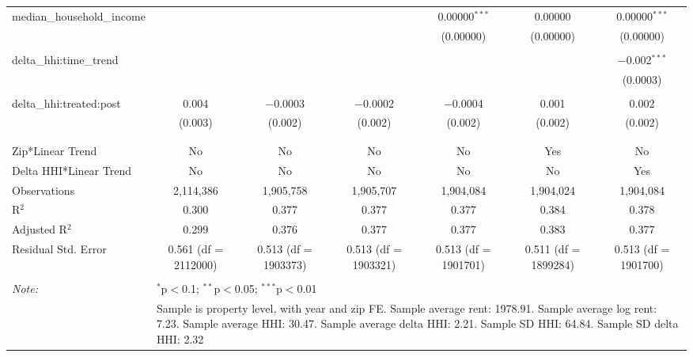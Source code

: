\begin{table}[H]
{\begin{tabular}{@{\extracolsep{5pt}}lcccccc}
  median\_household\_income &  &  &  & 0.00000$^{***}$ & 0.00000 & 0.00000$^{***}$ \\  

   &  &  &  & (0.00000) & (0.00000) & (0.00000) \\  

   & & & & & & \\  

  delta\_hhi:time\_trend &  &  &  &  &  & $-$0.002$^{***}$ \\  

   &  &  &  &  &  & (0.0003) \\  

   & & & & & & \\  

  delta\_hhi:treated:post & 0.004 & $-$0.0003 & $-$0.0002 & $-$0.0004 & 0.001 & 0.002 \\  

   & (0.003) & (0.002) & (0.002) & (0.002) & (0.002) & (0.002) \\  

   & & & & & & \\  

 \hline \\[-1.8ex]  

 Zip*Linear Trend & No & No & No & No & Yes & No \\  

 Delta HHI*Linear Trend & No & No & No & No & No & Yes \\  

 Observations & 2,114,386 & 1,905,758 & 1,905,707 & 1,904,084 & 1,904,024 & 1,904,084 \\  

 R$^{2}$ & 0.300 & 0.377 & 0.377 & 0.377 & 0.384 & 0.378 \\  

 Adjusted R$^{2}$ & 0.299 & 0.376 & 0.377 & 0.377 & 0.383 & 0.377 \\  

 Residual Std. Error & 0.561 (df = 2112000) & 0.513 (df = 1903373) & 0.513 (df = 1903321) & 0.513 (df = 1901701) & 0.511 (df = 1899284) & 0.513 (df = 1901700) \\  

 \hline  

 \hline \\[-1.8ex]  

 \textit{Note:}  & \multicolumn{6}{l}{$^{*}$p$<$0.1; $^{**}$p$<$0.05; $^{***}$p$<$0.01} \\  

  & \multicolumn{6}{l}{Sample is property level, with year and zip FE. Sample average rent: 1978.91. Sample average log rent: 7.23. Sample average HHI: 30.47. Sample average delta HHI: 2.21. Sample SD HHI: 64.84. Sample SD delta HHI: 2.32} \\  

 \end{tabular}}  

 \end{table}  

